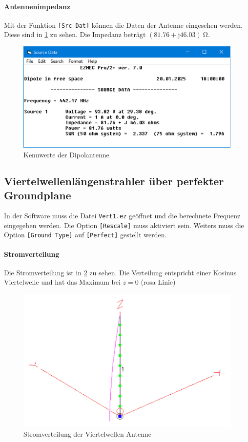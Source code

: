 \documentclass[colorlinks = true, allcolors = black, ngerman, 11pt,
a4paper, twoside, titlepage]{article}
\numberwithin{figure}{section}
\renewcommand{\si}[2]{\SI{#1}{#2}}
\begin{document}
	\paragraph{Antennenimpedanz}
	Mit der Funktion \texttt{[Src Dat]} können die Daten der Antenne eingesehen werden. Diese sind in \cref{fig:piuzdipol} zu sehen. Die Impedanz beträgt $(81.76+\mathrm{j} 46.03)\si{}{\ohm}$.
	
	\begin{figure}[h]
		\centering
		\includegraphics[width=0.7\linewidth]{imgs/PIUZ_dipol}
		\caption{Kennwerte der Dipolantenne}
		\label{fig:piuzdipol}
	\end{figure}
	
	
	
	
	\subsection{Viertelwellenlängenstrahler über perfekter Groundplane}
	In der Software muss die Datei \texttt{Vert1.ez} geöffnet und die berechnete Frequenz eingegeben werden. Die Option \texttt{[Rescale]} muss aktiviert sein.
	Weiters muss die Option \texttt{[Ground Type]} auf \texttt{[Perfect]} gestellt werden.
	
	\paragraph{Stromverteilung} Die Stromverteilung ist in \cref{fig:quartwaveantennaview} zu sehen. Die Verteilung entspricht einer Kosinus Viertelwelle und hat das Maximum bei $z=0$ (rosa Linie)
	\begin{figure}[h]
		\centering
		\includegraphics[width=0.7\linewidth]{imgs/quartwave_antenna_view}
		\caption{Stromverteilung der Viertelwellen Antenne}
		\label{fig:quartwaveantennaview}
	\end{figure}
	
\end{document}
